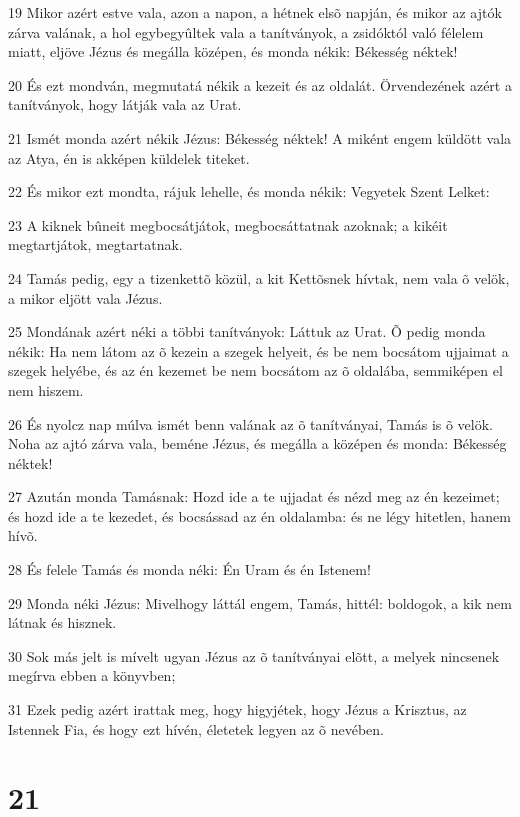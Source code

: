 \par 19 Mikor azért estve vala, azon a napon, a hétnek elsõ napján, és mikor az ajtók zárva valának, a hol egybegyûltek vala a tanítványok, a zsidóktól való félelem miatt, eljöve Jézus és megálla középen, és monda nékik: Békesség néktek!
\par 20 És ezt mondván, megmutatá nékik a kezeit és az oldalát. Örvendezének azért a tanítványok, hogy látják vala az Urat.
\par 21 Ismét monda azért nékik Jézus: Békesség néktek! A miként engem küldött vala az Atya, én is akképen küldelek titeket.
\par 22 És mikor ezt mondta, rájuk lehelle, és monda nékik: Vegyetek Szent Lelket:
\par 23 A kiknek bûneit megbocsátjátok, megbocsáttatnak azoknak; a kikéit megtartjátok, megtartatnak.
\par 24 Tamás pedig, egy a tizenkettõ közül, a kit Kettõsnek hívtak, nem vala õ velök, a mikor eljött vala Jézus.
\par 25 Mondának azért néki a többi tanítványok: Láttuk az Urat. Õ pedig monda nékik: Ha nem látom az õ kezein a szegek helyeit, és be nem bocsátom ujjaimat a szegek helyébe, és az én kezemet be nem bocsátom az õ oldalába, semmiképen el nem hiszem.
\par 26 És nyolcz nap múlva ismét benn valának az õ tanítványai, Tamás is õ velök. Noha az ajtó zárva vala, beméne Jézus, és megálla a középen és monda: Békesség néktek!
\par 27 Azután monda Tamásnak: Hozd ide a te ujjadat és nézd meg az én kezeimet; és hozd ide a te kezedet, és bocsássad az én oldalamba: és ne légy hitetlen, hanem hívõ.
\par 28 És felele Tamás és monda néki: Én Uram és én Istenem!
\par 29 Monda néki Jézus: Mivelhogy láttál engem, Tamás, hittél: boldogok, a kik nem látnak és hisznek.
\par 30 Sok más jelt is mívelt ugyan Jézus az õ tanítványai elõtt, a melyek nincsenek megírva ebben a könyvben;
\par 31 Ezek pedig azért irattak meg, hogy higyjétek, hogy Jézus a Krisztus, az Istennek Fia, és hogy ezt hívén, életetek legyen az õ nevében.

\chapter{21}

